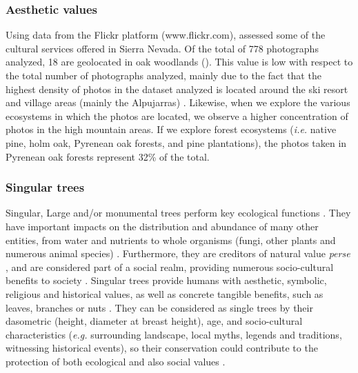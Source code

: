 \subsubsection{Aesthetic values}\label{sec:es:cultural-aesthetic} 
Using data from the Flickr platform (www.flickr.com), \citet{MorenoLlorcaetal2020EvaluatingTourist} assessed some of the cultural services offered in Sierra Nevada. Of the total of 778 photographs analyzed, 18 are geolocated in oak woodlands (). This value is low with respect to the total number of photographs analyzed, mainly due to the fact that the highest density of photos in the dataset analyzed is located around the ski resort and village areas (mainly the Alpujarras) \autocites{RosCandeiraetal2020SocialMedia}. Likewise, when we explore the various ecosystems in which the photos are located, we observe a higher concentration of photos in the high mountain areas. If we explore forest ecosystems (\emph{i.e.} native pine, holm oak, Pyrenean oak forests, and pine plantations), the photos taken in Pyrenean oak forests represent 32\% of the total.

\subsubsection{Singular trees}\label{sec:es:cultural-trees} 
Singular, Large and/or monumental trees perform key ecological functions \autocites[\emph{e.g.} nutrient cycling; support complex assemblages of species,][]{Zapponietal2017RoleMonumental}. They have important impacts on the distribution and abundance of many other entities, from water and nutrients to whole organisms (fungi, other plants and numerous animal species) \autocites{LindenmayerLaurance2017EcologyDistribution}. Furthermore, they are creditors of natural value \emph{perse} \autocites{Asciutoetal2016MonumentalTrees}, and are considered part of a social realm, providing numerous socio-cultural benefits to society \autocites{BlicharskaMikusinski2014IncorporatingSocial,MoyaMoya2013MonumentalTrees}. Singular trees provide humans with aesthetic, symbolic, religious and historical values, as well as concrete tangible benefits, such as leaves, branches or nuts \autocites{BlicharskaMikusinski2014IncorporatingSocial}. They can be considered as single trees by their dasometric (height, diameter at breast height), age, and socio-cultural characteristics (\emph{e.g.} surrounding landscape, local myths, legends and traditions, witnessing historical events), so their conservation could contribute to the protection of both ecological and also social values \autocites{BlicharskaMikusinski2014IncorporatingSocial}. 


